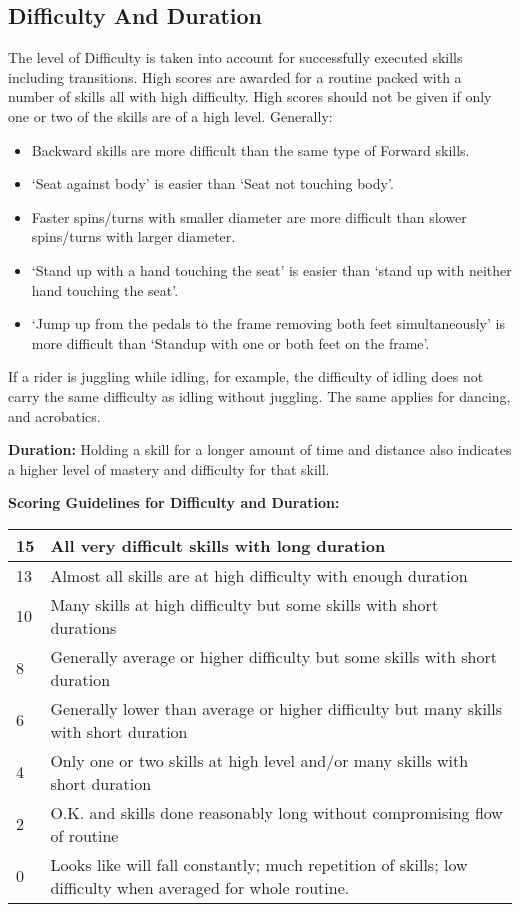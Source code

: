 \subsection{Difficulty And Duration}
The level of Difficulty is taken into account for successfully executed skills including transitions.
High scores are awarded for a routine packed with a number of skills all with high difficulty.
High scores should not be given if only one or two of the skills are of a high level.
Generally:
\begin{itemize} 
\item Backward skills are more difficult than the same type of Forward skills.
\item `Seat against body' is easier than `Seat not touching body'.
\item Faster spins/turns with smaller diameter are more difficult than slower spins/turns with larger diameter.
\item `Stand up with a hand touching the seat' is easier than `stand up with neither hand touching the seat'.
\item `Jump up from the pedals to the frame removing both feet simultaneously' is more difficult than `Standup with one or both feet on the frame'.
\end{itemize}
If a rider is juggling while idling, for example, the difficulty of idling does not carry the same difficulty as idling without juggling.
The same applies for dancing, and acrobatics.

\textbf{Duration:} Holding a skill for a longer amount of time and distance also indicates a higher level of mastery and difficulty for that skill.

\textbf{Scoring Guidelines for Difficulty and Duration:}

\begin{tabular}{|l|p{12.5cm}|}
\hline
15 & All very difficult skills with long duration \\
\hline
13 & Almost all skills are at high difficulty with enough duration \\
\hline
10 & Many skills at high difficulty but some skills with short durations \\
\hline
8 & Generally average or higher difficulty but some skills with short duration \\
\hline
6 & Generally lower than average or higher difficulty but many skills with short duration \\
\hline
4 & Only one or two skills at high level and/or many skills with short duration \\
\hline
2 & O.K. and skills done reasonably long without compromising flow of routine \\
\hline
0 & Looks like will fall constantly; much repetition of skills; low difficulty when averaged for whole routine. \\
\hline
\end{tabular}

